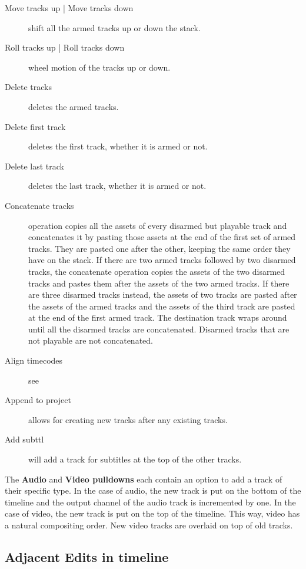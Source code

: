 \begin{description}
\item[Move tracks up | Move tracks down] shift all the armed
  tracks up or down the stack.
\item[Roll tracks up | Roll tracks down] wheel motion of the tracks up or down.
\item[Delete tracks] deletes the armed tracks.
\item[Delete first track] deletes the first track, whether it is armed or not.
\item[Delete last track] deletes the last track, whether it is
  armed or not.
\item[Concatenate tracks] operation copies all the assets of
  every disarmed but playable track and concatenates it by pasting
  those assets at the end of the first set of armed tracks. They are
  pasted one after the other, keeping the same order they have on the
  stack. If there are two armed tracks followed by two disarmed
  tracks, the concatenate operation copies the assets of the two
  disarmed tracks and pastes them after the assets of the two armed
  tracks. If there are three disarmed tracks instead, the assets of
  two tracks are pasted after the assets of the armed tracks and the
  assets of the third track are pasted at the end of the first armed
  track. The destination track wraps around until all the disarmed
  tracks are concatenated. Disarmed tracks that are not playable are
  not concatenated.
\item[Align timecodes] see 
\item[Append to project] allows for creating new tracks after
  any existing tracks.
\item[Add subttl] will add a track for subtitles at the top of
  the other tracks.
\end{description}

The \textbf{Audio}  and \textbf{Video pulldowns}  each contain an
option to add a track of their specific type. In the case of audio,
the new track is put on the bottom of the timeline and the output
channel of the audio track is incremented by one. In the case of
video, the new track is put on the top of the timeline. This way,
video has a natural compositing order. New video tracks are overlaid
on top of old tracks.

\subsection{Adjacent Edits in timeline}%
\label{sub:adjacent_edit_timeline}

